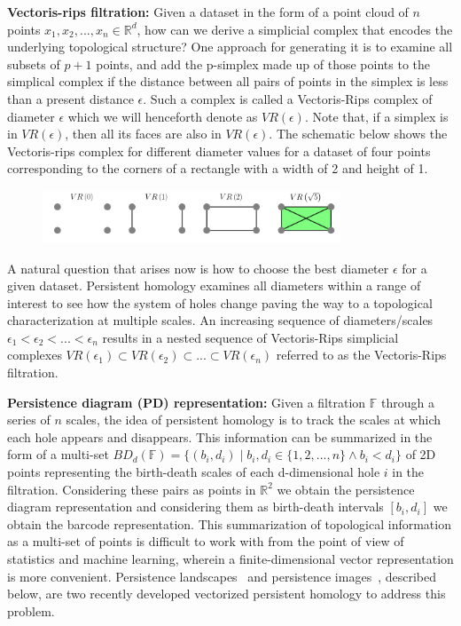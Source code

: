 \documentclass{article}
\begin{document}
\smallskip
\noindent \textbf{Vectoris-rips filtration:} Given a dataset in the form of a point cloud of $n$ points $x_1, x_2, ..., x_n \in \mathbb{R}^d$, how can we derive a simplicial complex that encodes the underlying topological structure? One approach for generating it is to examine all subsets of $p+1$ points, and add the p-simplex made up of those points to the simplical complex if the distance between all pairs of points in the simplex is less than a present distance $\epsilon$. Such a complex is called a Vectoris-Rips complex of diameter $\epsilon$ which we will henceforth denote as $VR(\epsilon)$. Note that, if a simplex is in $VR(\epsilon)$, then all its faces are also in $VR(\epsilon)$. The schematic below shows the Vectoris-rips complex for different diameter values for a dataset of four points corresponding to the corners of a rectangle with a width of 2 and height of 1.
\vspace{-0.2cm}
%
\begin{figure}[!h]
\centering
\includegraphics[width=3.5in]{figures/vrcomplex-diagram.png}
\end{figure}
%

\noindent A natural question that arises now is how to choose the best diameter $\epsilon$ for a given dataset. Persistent homology examines all diameters within a range of interest to see how the system of holes change paving the way to a topological characterization at multiple scales. An increasing sequence of diameters/scales $\epsilon_1 < \epsilon_2 < ... < \epsilon_n$ results in a nested sequence of Vectoris-Rips simplicial complexes $VR(\epsilon_1) \subset VR(\epsilon_2) \subset ... \subset VR(\epsilon_n)$ referred to as the Vectoris-Rips filtration.

\smallskip
\noindent \textbf{Persistence diagram (PD) representation:} Given a filtration $\mathbb{F}$ through a series of $n$ scales, the idea of persistent homology is to track the scales at which each hole appears and disappears. This information can be summarized in the form of a multi-set $BD_d(\mathbb{F}) = \{(b_i, d_i) \mid b_i, d_i \in \{1, 2, ..., n\} \land b_i < d_i \}$ of 2D points representing the birth-death scales of each d-dimensional hole $i$ in the filtration. Considering these pairs as points in $\mathbb{R}^2$ we obtain the persistence diagram representation and considering them as birth-death intervals $[b_i, d_i]$ we obtain the barcode representation. This summarization of topological information as a multi-set of points is difficult to work with from the point of view of statistics and machine learning, wherein a finite-dimensional vector representation is more convenient. Persistence landscapes~\cite{Adams2015} and persistence images~\cite{Bubenik2012}, described below, are two recently developed vectorized persistent homology to address this problem.
\end{document}

